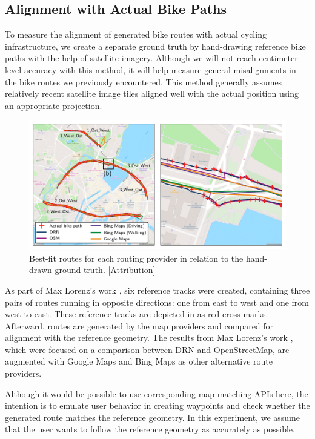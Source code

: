 \subsection{Alignment with Actual Bike Paths}\label{sec:routing-alignment}\label{sec:lorenz3}

To measure the alignment of generated bike routes with actual cycling infrastructure, we create a separate ground truth by hand-drawing reference bike paths with the help of satellite imagery. Although we will not reach centimeter-level accuracy with this method, it will help measure general misalignments in the bike routes we previously encountered. This method generally assumes relatively recent satellite image tiles aligned well with the actual position using an appropriate projection.

\begin{figure}[t]
\centering 
\includegraphics[width=\linewidth]{images/routing-hand-drawn-ground-truth.pdf}
\caption{Best-fit routes for each routing provider in relation to the hand-drawn ground truth. [\hyperref[attribution]{Attribution}]}
\label{fig:routing-hand-drawn-ground-truth}
\end{figure}

As part of Max Lorenz's work \cite{lorenz_2022}, six reference tracks were created, containing three pairs of routes running in opposite directions: one from east to west and one from west to east. These reference tracks are depicted in  as red cross-marks. Afterward, routes are generated by the map providers and compared for alignment with the reference geometry. The results from Max Lorenz's work \cite{lorenz_2022}, which were focused on a comparison between DRN and OpenStreetMap, are augmented with Google Maps and Bing Maps as other alternative route providers.

Although it would be possible to use corresponding map-matching APIs here, the intention is to emulate user behavior in creating waypoints and check whether the generated route matches the reference geometry. In this experiment, we assume that the user wants to follow the reference geometry as accurately as possible.

